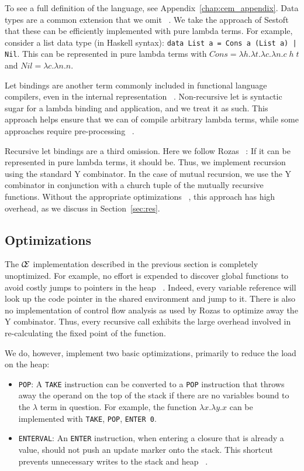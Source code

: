 To see a full definition of the language, see Appendix~\ref{chap:cem_appendix}.
Data types are a common extension that we omit ~\cite{jonesstg,boquist1997grin}.
We take the approach of Sestoft ~\cite{sestoft} that these can be efficiently
implemented with pure lambda terms. For example, consider a list data type (in
Haskell syntax): \texttt{data List a = Cons a (List a) | Nil}. This can be
represented in pure lambda terms with $\mathit{Cons} = \lambda h.\lambda t.\lambda
c.\lambda n.c \; h \; t$ and $\mathit{Nil} = \lambda c.\lambda n.n$. 

Let bindings are another term commonly included in functional language
compilers, even in the internal representation ~\cite{boquist1997grin,jonesstg}.
Non-recursive let is syntactic sugar for a lambda binding and application, and
we treat it as such. This approach helps ensure that we can of
compile arbitrary lambda terms, while some approaches require pre-processing
~\cite{sestoft,TIM}.

Recursive let bindings are a third omission. Here we follow Rozas
~\cite{rozas1992taming}: If it can be represented in pure lambda terms, it should
be. Thus, we implement recursion using the standard Y combinator. In the case of
mutual recursion, we use the Y combinator in conjunction with a church tuple of
the mutually recursive functions. Without the appropriate optimizations
~\cite{rozas1992taming}, this approach has high overhead, as we discuss in
Section~\ref{sec:res}.

\subsection{Optimizations}

The $\mathcal{C} \mskip -4mu \mathcal{E}$ implementation described in the previous section is 
completely unoptimized. For example, no effort is expended to
discover global functions to avoid costly jumps to pointers in the heap
~\cite{jonesstg}. Indeed, every variable reference will look up the code pointer
in the shared environment and jump to it. There is also no implementation of 
control flow analysis as used by Rozas to optimize away the Y combinator.  Thus,
every recursive call exhibits the large overhead involved in re-calculating the
fixed point of the function.  

We do, however, implement two basic optimizations, primarily to reduce the load
on the heap:

\begin{itemize}
\item \texttt{POP}: A \texttt{TAKE} instruction can be converted to a \texttt{POP}
instruction that throws away the operand on the top of the stack if there are no
variables bound to the $\lambda$ term in question. For example, the function
$\lambda x.\lambda y.x$ can be implemented with \texttt{TAKE}, \texttt{POP},
\texttt{ENTER 0}.  
\item \texttt{ENTERVAL}: An \texttt{ENTER} instruction, when entering a
closure that is already a value, should not push an update marker onto the
stack. This shortcut prevents unnecessary writes to the stack and heap
~\cite{jonesstg,lkm,sestoft}.  
\end{itemize}

